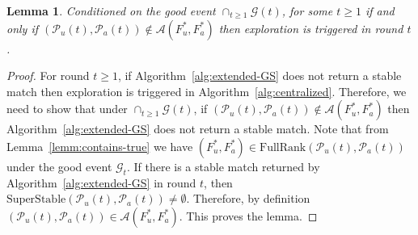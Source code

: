 \documentclass{article}
\newtheorem{lemma}[theorem]{Lemma}
\begin{document}
\begin{lemma}\label{lemm:explore}
    Conditioned on the good event $\cap_{t \geq 1}\mathcal{G}(t)$, for some $t\geq 1$ if and only if $(\mathcal{P}_{u}(t), \mathcal{P}_{a}(t)) \notin \mathcal{A}(F^*_{u}, F^*_{a})$ then exploration is triggered in round $t$.
\end{lemma}
\begin{proof}
    For round $t\geq 1$, if Algorithm~\ref{alg:extended-GS} does not return a stable match then exploration is triggered in  Algorithm~\ref{alg:centralized}. Therefore, we need to show that under $\cap_{t \geq 1}\mathcal{G}(t)$, if  $(\mathcal{P}_{u}(t), \mathcal{P}_{a}(t)) \notin \mathcal{A}(F^*_{u}, F^*_{a})$ then Algorithm~\ref{alg:extended-GS} does not return a stable match. Note that from Lemma~\ref{lemm:contains-true} we have $(F^*_{u}, F^*_{a}) \in \mathrm{FullRank}(\mathcal{P}_{u}(t), \mathcal{P}_{a}(t))$ under the good event $\mathcal{G}_t$. If there is a stable match returned by Algorithm~\ref{alg:extended-GS}  in round $t$, then $\mathrm{SuperStable}(\mathcal{P}_{u}(t), \mathcal{P}_{a}(t)) \neq \emptyset$. Therefore, by definition $(\mathcal{P}_{u}(t), \mathcal{P}_{a}(t)) \in \mathcal{A}(F^*_{u}, F^*_{a})$. This proves the lemma.
\end{proof}
\end{document}
